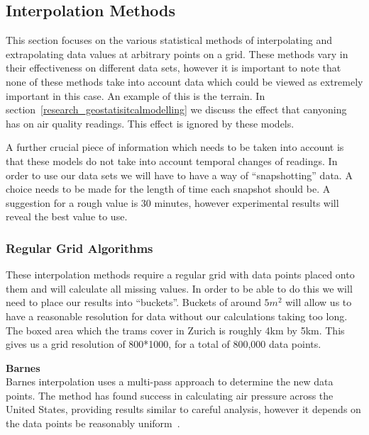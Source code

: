 \subsection{Interpolation Methods}\label{background_interpolation_methods}
    This section focuses on the various statistical methods of interpolating and extrapolating data values at arbitrary points on a grid. These methods vary in their effectiveness on different data sets, however it is important to note that none of these methods take into account data which could be viewed as extremely important in this case. An example of this is the terrain. In section~\ref{research_geostatisitcalmodelling} we discuss the effect that canyoning has on air quality readings. This effect is ignored by these models. 

    A further crucial piece of information which needs to be taken into account is that these models do not take into account temporal changes of readings. In order to use our data sets we will have to have a way of ``snapshotting'' data. A choice needs to be made for the length of time each snapshot should be. A suggestion for a rough value is 30 minutes, however experimental results will reveal the best value to use.



    \subsubsection{Regular Grid Algorithms}\label{datavalidation_regulargrid}

        These interpolation methods require a regular grid with data points placed onto them and will calculate all missing values. In order to be able to do this we will need to place our results into ``buckets''. Buckets of around $5m^{2}$ will allow us to have a reasonable resolution for data without our calculations taking too long. The boxed area which the trams cover in Zurich is roughly 4km by 5km. This gives us a grid resolution of 800*1000, for a total of 800,000 data points. 

        \textbf{Barnes}\label{datavalidation_barnes} \\

            Barnes interpolation uses a multi-pass approach to determine the new data points. The method has found success in calculating air pressure across the United States, providing results similar to careful analysis, however it depends on the data points be reasonably uniform~\cite{barnesinterpolation}.

